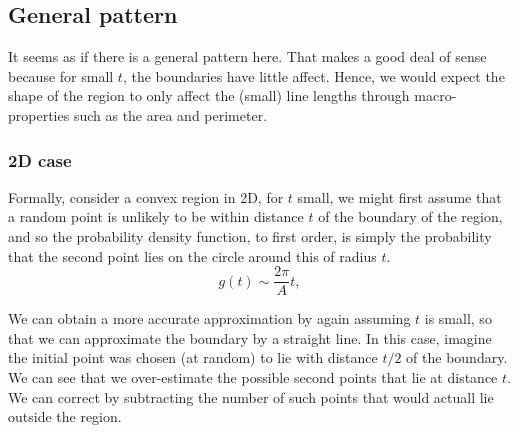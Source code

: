 \documentclass{article}
\begin{document}

\subsection{General pattern}

It seems as if there is a general pattern here.  That makes a good
deal of sense because for small $t$, the boundaries have little
affect. Hence, we would expect the shape of the region to only affect
the (small) line lengths through macro-properties such as the area and
perimeter.

\subsubsection{2D case}

Formally, consider a convex region in 2D, for $t$ small, we might
first assume that a random point is unlikely to be within distance $t$
of the boundary of the region, and so the probability density
function, to first order, is simply the probability that the second
point lies on the circle around this of radius $t$.
\begin{equation}
  g(t) \sim \frac{2 \pi}{A} t, 
\end{equation}

We can obtain a more accurate approximation by again assuming $t$ is
small, so that we can approximate the boundary by a straight line. In
this case, imagine the initial point was chosen (at random) to lie
with distance $t/2$ of the boundary. We can see that we over-estimate
the possible second points that lie at distance $t$. We can correct by
subtracting the number of such points that would actuall lie outside
the region.
\end{document}
